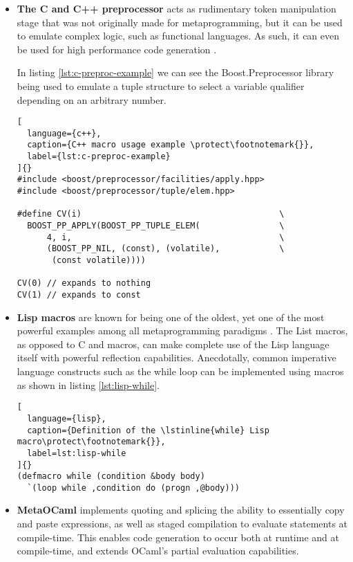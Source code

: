 \documentclass[../main]{subfiles}
\begin{document}
\begin{itemize}

\item
\textbf{The C and C++ preprocessor} acts as rudimentary token manipulation stage
that was not originally made for metaprogramming, but it can be used
to emulate complex logic, such as functional languages. As such, it can even
be used for high performance code generation \cite{6662183}.

In listing \ref{lst:c-preproc-example} we can see the Boost.Preprocessor library
being used to emulate a tuple structure to select a variable qualifier depending
on an arbitrary number.

\begin{lstlisting}[
  language={c++},
  caption={C++ macro usage example \protect\footnotemark{}},
  label={lst:c-preproc-example}
]{}
#include <boost/preprocessor/facilities/apply.hpp>
#include <boost/preprocessor/tuple/elem.hpp>

#define CV(i)                                        \
  BOOST_PP_APPLY(BOOST_PP_TUPLE_ELEM(                \
      4, i,                                          \
      (BOOST_PP_NIL, (const), (volatile),            \
       (const volatile))))

CV(0) // expands to nothing
CV(1) // expands to const
\end{lstlisting}

\item
\textbf{Lisp macros}
are known for being one of the oldest, yet one of the most powerful
examples among all metaprogramming paradigms \cite{metaprog-lang-survey}.
The List macros, as opposed to C and \cpp macros, can make complete use of
the Lisp language itself with powerful reflection capabilities.
Anecdotally, common imperative language constructs such as the while loop
can be implemented using macros as shown in listing \ref{lst:lisp-while}.

\begin{lstlisting}[
  language={lisp},
  caption={Definition of the \lstinline{while} Lisp macro\protect\footnotemark{}},
  label=lst:lisp-while
]{}
(defmacro while (condition &body body)
  `(loop while ,condition do (progn ,@body)))
\end{lstlisting}

\item
\textbf{MetaOCaml} \cite{metaocaml} implements quoting and splicing
\ie the ability to essentially copy and paste expressions,
as well as staged compilation to evaluate statements at compile-time.
This enables code generation to occur both at runtime and at compile-time,
and extends OCaml's partial evaluation capabilities.


\end{itemize}
\end{document}
